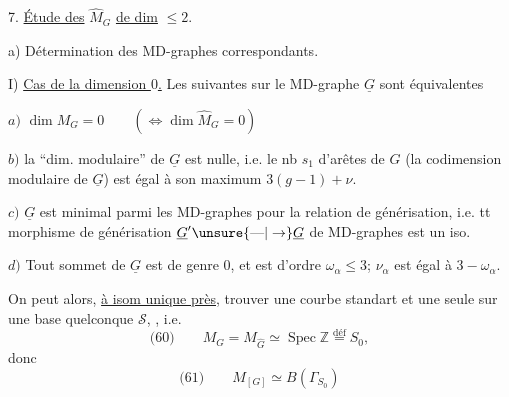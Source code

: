 7. \uline{Étude des}  $\widehat M_G$  \uline{de dim} $\leq 2$.

a) Détermination des MD-graphes correspondants.

I) \uline{Cas de la dimension $0$.} Les   suivantes sur le MD-graphe $\underline G$ sont équivalentes

$a)$ $\dim M_G=0\qquad(\Longleftrightarrow\dim\widehat M_G=0)$

$b)$  la ``dim. modulaire'' de $\underline G$ est nulle, i.e. le nb $s_1$ d'arêtes de  $G$ (la codimension modulaire de $\underline G$) est égal à son maximum $3(g-1)+\nu$.

$c)$  $\underline G$ est minimal parmi les MD-graphes pour la relation de générisation, i.e. tt morphisme de générisation $\underline G'\unsure{\mathbin{\text{---}}|\to}\underline G$ de MD-graphes est un iso.

$d)$ Tout sommet \inserted{$\alpha$} de $\underline G$ est de genre $0$, et est d'ordre  $\omega_\alpha\leq3$;   $\nu_\alpha$ est égal à $3-\omega_\alpha$.

On peut alors, \uline{à isom unique près}, trouver une courbe standart  et une seule sur une base quelconque $\mathcal S$, , i.e.
\[
\text{(60)}\qquad M_G=M_{\widehat G}\simeq\operatorname{Spec}\mathbb Z\overset{\mathrm{déf}}=S_0,
\]
donc
\[
\text{(61)}\qquad M_{[G]}\simeq B(\Gamma_{S_0})
\]
